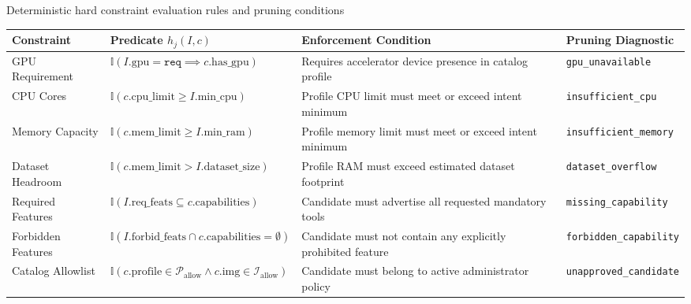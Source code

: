 \begin{table}[ht]{Deterministic hard constraint evaluation rules and pruning conditions}
\label{tab:hard_constraints_spec}
\centering\footnotesize
\begin{tabular}{p{2.6cm}p{3.8cm}p{4.2cm}p{3.0cm}}
\toprule
\textbf{Constraint} & \textbf{Predicate $h_j(I, c)$} & \textbf{Enforcement Condition} & \textbf{Pruning Diagnostic} \\
\midrule
GPU Requirement & $\mathbb{I}(I.\mathrm{gpu} = \texttt{req} \implies c.\mathrm{has\_gpu})$ & Requires accelerator device presence in catalog profile & \texttt{gpu\_unavailable} \\
CPU Cores & $\mathbb{I}(c.\mathrm{cpu\_limit} \ge I.\mathrm{min\_cpu})$ & Profile CPU limit must meet or exceed intent minimum & \texttt{insufficient\_cpu} \\
Memory Capacity & $\mathbb{I}(c.\mathrm{mem\_limit} \ge I.\mathrm{min\_ram})$ & Profile memory limit must meet or exceed intent minimum & \texttt{insufficient\_memory} \\
Dataset Headroom & $\mathbb{I}(c.\mathrm{mem\_limit} > I.\mathrm{dataset\_size})$ & Profile RAM must exceed estimated dataset footprint & \texttt{dataset\_overflow} \\
Required Features & $\mathbb{I}(I.\mathrm{req\_feats} \subseteq c.\mathrm{capabilities})$ & Candidate must advertise all requested mandatory tools & \texttt{missing\_capability} \\
Forbidden Features & $\mathbb{I}(I.\mathrm{forbid\_feats} \cap c.\mathrm{capabilities} = \emptyset)$ & Candidate must not contain any explicitly prohibited feature & \texttt{forbidden\_capability} \\
Catalog Allowlist & $\mathbb{I}(c.\mathrm{profile} \in \mathcal{P}_{\mathrm{allow}} \land c.\mathrm{img} \in \mathcal{I}_{\mathrm{allow}})$ & Candidate must belong to active administrator policy & \texttt{unapproved\_candidate} \\
\bottomrule
\end{tabular}
\end{table}
